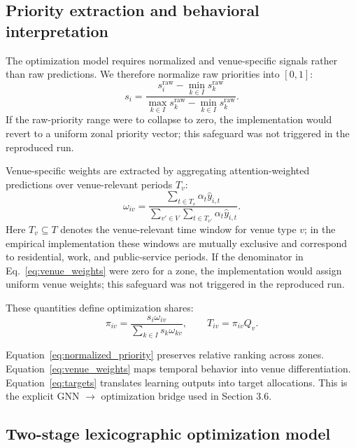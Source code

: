 \documentclass[final,5p,times,twocolumn,authoryear]{elsarticle}
\begin{document}
\subsection{Priority extraction and behavioral interpretation}

The optimization model requires normalized and venue-specific signals rather than raw
predictions. We therefore normalize raw priorities into $[0,1]$:
\begin{equation}
s_i=\frac{s_i^{\mathrm{raw}}-\min_{k\in I} s_k^{\mathrm{raw}}}
{\max_{k\in I} s_k^{\mathrm{raw}}-\min_{k\in I} s_k^{\mathrm{raw}}}.
\label{eq:normalized_priority}
\end{equation}
If the raw-priority range were to collapse to zero, the implementation would revert to a
uniform zonal priority vector; this safeguard was not triggered in the reproduced run.

Venue-specific weights are extracted by aggregating attention-weighted predictions over
venue-relevant periods $T_v$:
\begin{equation}
\omega_{iv}=\frac{\sum_{t\in T_v}\alpha_t\hat{y}_{i,t}}
{\sum_{v'\in V}\sum_{t\in T_{v'}}\alpha_t\hat{y}_{i,t}}.
\label{eq:venue_weights}
\end{equation}
Here $T_v\subseteq T$ denotes the venue-relevant time window for venue type $v$; in the
empirical implementation these windows are mutually exclusive and correspond to residential,
work, and public-service periods. If the denominator in Eq.~\eqref{eq:venue_weights} were
zero for a zone, the implementation would assign uniform venue weights; this safeguard was
not triggered in the reproduced run.

These quantities define optimization shares:
\begin{equation}
\pi_{iv}=\frac{s_i\omega_{iv}}{\sum_{k\in I}s_k\omega_{kv}},
\qquad
T_{iv}=\pi_{iv}Q_v.
\label{eq:targets}
\end{equation}

Equation~\eqref{eq:normalized_priority} preserves relative ranking across zones.
Equation~\eqref{eq:venue_weights} maps temporal behavior into venue differentiation.
Equation~\eqref{eq:targets} translates learning outputs into target allocations. This is the
explicit GNN $\to$ optimization bridge used in Section 3.6.

\subsection{Two-stage lexicographic optimization model}
\end{document}
